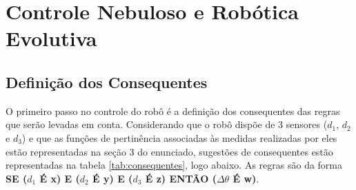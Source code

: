 \section{Controle Nebuloso e Robótica Evolutiva}

\setcounter{subsection}{-1}
\subsection{Definição dos Consequentes }

O primeiro passo no controle do robô é a definição dos consequentes das regras
que serão levadas em conta. Considerando que o robô dispõe de 3 sensores
(\(d_1\), \(d_2\) e \(d_3\)) e que as funções de pertinência associadas às
medidas realizadas por eles estão representadas na seção 3 do enunciado, sugestões de consequentes estão
representadas na tabela \ref{tab:consequentes}, logo abaixo. As regras são da
forma \textbf{SE (\(d_1\) É x) E (\(d_2\) É y) E (\(d_3\) É z) ENTÃO
(\(\Delta \theta\) É w)}.

